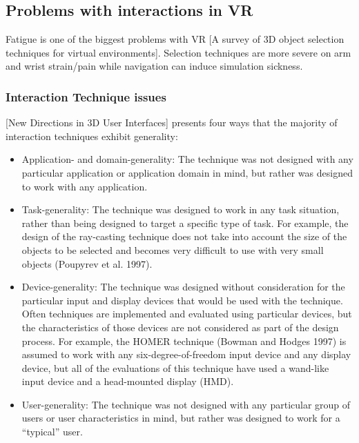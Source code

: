 \subsection{Problems with interactions in VR}
Fatigue is one of the biggest problems with VR [A survey of 3D object selection techniques for virtual environments].
Selection techniques are more severe on arm and wrist strain/pain while navigation can induce simulation sickness.

\subsubsection{Interaction Technique issues}

[New Directions in 3D User Interfaces] presents four ways that the majority of interaction techniques exhibit generality:
\begin{itemize}
  \item Application- and domain-generality: The technique was not designed with any particular application or application domain in mind, but rather was designed to work with any application.
  \item Task-generality: The technique was designed to work in any task situation, rather than being designed to target a specific type of task. For example, the design of the ray-casting technique does not take into account the size of the objects to be selected and becomes very difficult to use with very small objects (Poupyrev et al. 1997).
  \item Device-generality: The technique was designed without consideration for the particular input and display devices that would be used with the technique. Often techniques are implemented and evaluated using particular devices, but the characteristics of those devices are not considered as part of the design process. For example, the HOMER technique (Bowman and Hodges 1997) is assumed to work with any six-degree-of-freedom input device and any display device, but all of the evaluations of this technique have used a wand-like input device and a head-mounted display (HMD).
  \item User-generality: The technique was not designed with any particular group of users or user characteristics in mind, but rather was designed to work for a “typical” user.

\end{itemize}
